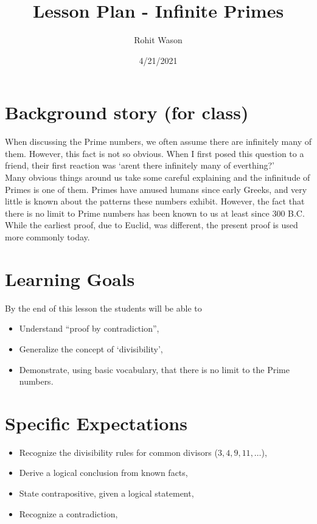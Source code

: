 \documentclass{article}
\author{Rohit Wason}
\title{Lesson Plan - Infinite Primes}
\date{4/21/2021}
\begin{document}
\maketitle

\section*{Background story (for class)}
When discussing the Prime numbers, we often assume there are infinitely
many of them. However, this fact is not so obvious. When I first posed this
question to a friend, their first reaction was `aren\textquotesingle t there infinitely many of 
everthing?'\\

Many obvious things around us take some careful explaining and the infinitude of Primes
is one of them. Primes have amused humans since early Greeks, and very
little is known about the patterns these numbers exhibit. However, the fact that there
is no limit to Prime numbers has been known to us at least since 300 B.C. While the
earliest proof, due to Euclid, was different, the present proof is used more commonly today.

\section*{Learning Goals}
By the end of this lesson the students will be able to
\begin{itemize}
  \item Understand ``proof by contradiction'',
  \item Generalize the concept of `divisibility',
  \item Demonstrate, using basic vocabulary, that there is no limit to the Prime numbers.
\end{itemize}

\section*{Specific Expectations}
\begin{itemize}
  \item Recognize the divisibility rules for common divisors ($3,4,9,11,\dots$),
  \item Derive a logical conclusion from known facts,
  \item State contrapositive, given a logical statement,
  \item Recognize a contradiction,
\end{itemize}
\end{document}
